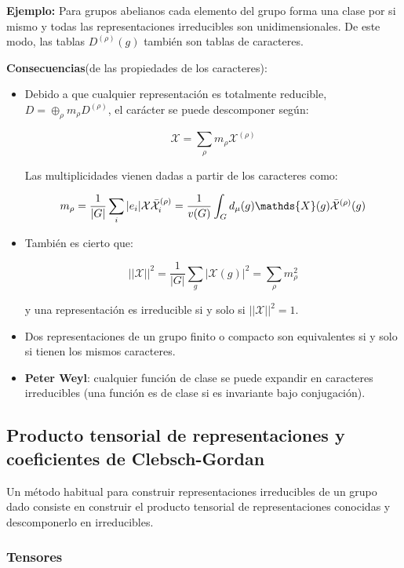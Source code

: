\documentclass{article}
\begin{document}
\smallskip

\textbf{Ejemplo:} Para grupos abelianos cada elemento del grupo forma una clase por si mismo y todas las representaciones irreducibles son unidimensionales. De este modo, las tablas $D^{(\rho)}(g)$ también son tablas de caracteres.
\smallskip

\textbf{Consecuencias}(de las propiedades de los caracteres):

\begin{itemize}
\item Debido a que cualquier representación es totalmente reducible, $D= \oplus _\rho m_\rho D^{(\rho)}$, el carácter se puede descomponer según:

$$\mathcal{X}=\sum _{\rho} m_\rho \mathcal{X}^{(\rho)}$$

Las multiplicidades vienen dadas a partir de los caracteres como:

$$m_\rho =\frac{1}{|G|}\sum _i |e_i|\mathcal{X}\bar{\mathcal{X}}_i^{(\rho)}=\frac{1}{v(G)}\int _G d_\mu (g)\mathds{X}(g)\Bar{\mathcal{X}}^{(\rho)}(g)$$

\item También es cierto que:

$$||\mathcal{X}||^2=\frac{1}{|G|}\sum _g|\mathcal{X}(g)|^2=\sum _\rho m_\rho ^2$$

y una representación es irreducible si y  solo si  $||\mathcal{X}||^2=1$.

\item Dos representaciones de un grupo finito o compacto son equivalentes si y solo si tienen los mismos caracteres.

\item \textbf{Peter Weyl}: cualquier función de clase se puede expandir en caracteres irreducibles (una función es de clase si es invariante bajo conjugación).

\end{itemize}

\subsection{Producto tensorial de representaciones y coeficientes de Clebsch-Gordan}

Un método habitual para construir representaciones irreducibles de un grupo dado consiste en construir el producto tensorial de representaciones conocidas y descomponerlo en irreducibles.

\subsubsection{Tensores}
\end{document}

